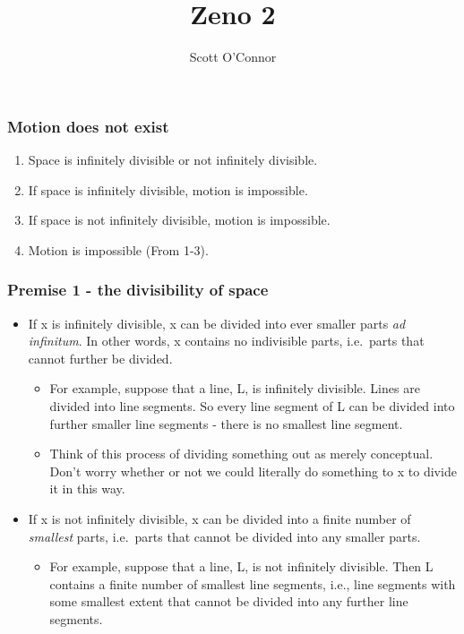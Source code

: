 \documentclass[]{article}
\title{Zeno 2}
\author{Scott O’Connor}
\providecommand{\tightlist}{%
  \setlength{\itemsep}{0pt}\setlength{\parskip}{0pt}}
\begin{document}
\maketitle

\subsubsection{Motion does not exist}\label{motion-does-not-exist}

\begin{enumerate}
\def\labelenumi{\arabic{enumi}.}
\item
  Space is infinitely divisible or not infinitely divisible.
\item
  If space is infinitely divisible, motion is impossible.
\item
  If space is not infinitely divisible, motion is impossible.
\item
  Motion is impossible (From 1-3).
\end{enumerate}

\subsubsection{Premise 1 - the divisibility of
space}\label{premise-1---the-divisibility-of-space}

\begin{itemize}
\item
  If x is infinitely divisible, x can be divided into ever smaller parts
  \emph{ad infinitum}. In other words, x contains no indivisible parts,
  i.e.~parts that cannot further be divided.

  \begin{itemize}
  \item
    For example, suppose that a line, L, is infinitely divisible. Lines
    are divided into line segments. So every line segment of L can be
    divided into further smaller line segments - there is no smallest
    line segment.
  \item
    Think of this process of dividing something out as merely
    conceptual. Don't worry whether or not we could literally do
    something to x to divide it in this way.
  \end{itemize}
\item
  If x is not infinitely divisible, x can be divided into a finite
  number of \emph{smallest} parts, i.e.~parts that cannot be divided
  into any smaller parts.

  \begin{itemize}
  \tightlist
  \item
    For example, suppose that a line, L, is not infinitely divisible.
    Then L contains a finite number of smallest line segments, i.e.,
    line segments with some smallest extent that cannot be divided into
    any further line segments.
  \end{itemize}
\end{itemize}
\end{document}
